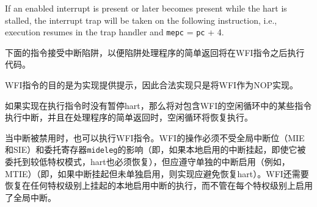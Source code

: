 {If an enabled interrupt is present or later becomes present while the
hart is stalled, the interrupt trap will be taken on the
following instruction, i.e., execution resumes in the trap handler and
{\tt mepc} = {\tt pc} + 4.

\iffalse
\begin{commentary}
The following instruction takes the interrupt trap so
that a simple return from the trap handler will execute code after the
WFI instruction.
\end{commentary}
\fi
\begin{commentary}
下面的指令接受中断陷阱，以便陷阱处理程序的简单返回将在WFI指令之后执行代码。
\end{commentary}

\iffalse
The purpose of the WFI instruction is to provide a hint to the implementation,
and so a legal implementation is to simply implement WFI as a NOP.
\fi
WFI指令的目的是为实现提供提示，因此合法实现只是将WFI作为NOP实现。

\iffalse
\begin{commentary}
If the implementation does not stall the hart on execution of the
instruction, then the interrupt will be taken on some instruction in
the idle loop containing the WFI, and on a simple return from the
handler, the idle loop will resume execution.
\end{commentary}
\fi
\begin{commentary}
如果实现在执行指令时没有暂停hart，那么将对包含WFI的空闲循环中的某些指令执行中断，并且在处理程序的简单返回时，空闲循环将恢复执行。
\end{commentary}

\iffalse
The WFI instruction can also be executed when interrupts are disabled.  The
operation of WFI must be unaffected by the global interrupt bits in {\tt
mstatus} (MIE and SIE) and the delegation register {\tt mideleg}
(i.e., the hart must resume if a locally enabled interrupt becomes pending,
even if it has been delegated to a less-privileged mode), but should honor the
individual interrupt enables (e.g, MTIE) (i.e., implementations should
avoid resuming the hart if the interrupt is pending but not
individually enabled).  WFI is also required to resume execution for
locally enabled interrupts pending at any privilege level, regardless
of the global interrupt enable at each privilege level.

If the event that causes the hart to resume execution does not cause
an interrupt to be taken, execution will resume at {\tt pc} + 4, and
software must determine what action to take, including looping back to
repeat the WFI if there was no actionable event.
\fi
当中断被禁用时，也可以执行WFI指令。WFI的操作必须不受全局中断位（MIE和SIE）和委托寄存器{\tt mideleg}的影响（即，如果本地启用的中断挂起，即使它被委托到较低特权模式，hart也必须恢复），但应遵守单独的中断启用（例如，MTIE）（即，如果中断挂起但未单独启用，则实现应避免恢复hart）。WFI还需要恢复在任何特权级别上挂起的本地启用中断的执行，而不管在每个特权级别上启用了全局中断。

}
